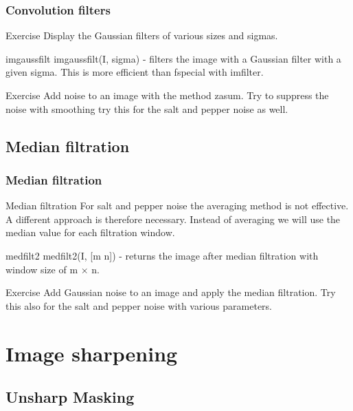 \documentclass{beamer}
\begin{document}
\begin{frame}
\frametitle{Convolution filters}
\begin{block}{Exercise}
Display the Gaussian filters of various sizes and sigmas.
\end{block}

\begin{block}{imgaussfilt}
imgaussfilt(I, sigma) - filters the image with a Gaussian filter with a given sigma. This is more efficient than fspecial with imfilter.
\end{block}

\begin{block}{Exercise}
Add noise to an image with the method zasum. Try to suppress the noise with smoothing try this for the salt and pepper noise as well.
\end{block}
\end{frame}

\subsection{Median filtration}
\begin{frame}
\frametitle{Median filtration}
\begin{block}{Median filtration}
For salt and pepper noise the averaging method is not effective. A different approach is therefore necessary. Instead of averaging we will use the median value for each filtration window.
\end{block}

\begin{block}{medfilt2}
medfilt2(I, [m n]) - returns the image after median filtration with window size of m $\times$ n.
\end{block}

\begin{block}{Exercise}
Add Gaussian noise to an image and apply the median filtration. Try this also for the salt and pepper noise with various parameters.
\end{block}
\end{frame}

\section{Image sharpening}
\subsection{Unsharp Masking}
\end{document}
